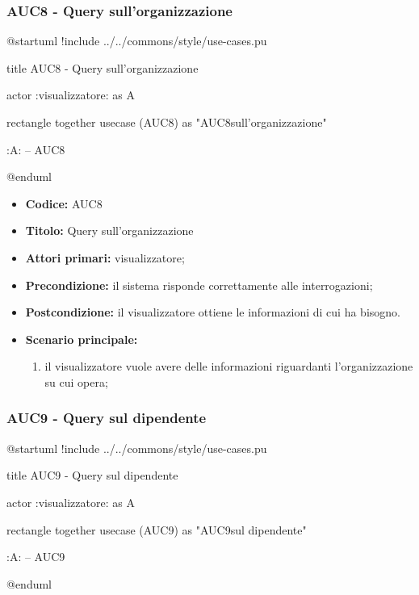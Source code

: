 \documentclass[casi-duso]{subfiles}
\begin{document}
\subsubsection{AUC8 - Query sull'organizzazione}%
\label{subsub:AUC8}

\begin{plantuml}
@startuml
!include ../../commons/style/use-cases.pu

title AUC8 - Query sull'organizzazione

actor :visualizzatore: as A

rectangle {
  together {
    usecase (AUC8) as "AUC8\nQuery sull'organizzazione"
  }
}

:A: -- AUC8

@enduml
\end{plantuml}

\begin{itemize}
  \item \textbf{Codice:} AUC8
  \item \textbf{Titolo:} Query sull'organizzazione
  \item \textbf{Attori primari:} visualizzatore;
  \item \textbf{Precondizione:} il sistema risponde correttamente alle interrogazioni;
  \item \textbf{Postcondizione:} il visualizzatore ottiene le informazioni di cui ha bisogno.
  \item \textbf{Scenario principale:}
  \begin{enumerate}
    \item il visualizzatore vuole avere delle informazioni riguardanti l'organizzazione su cui opera;
  \end{enumerate}
\end{itemize}

\subsubsection{AUC9 - Query sul dipendente}%
\label{subsub:AUC9}

\begin{plantuml}
@startuml
!include ../../commons/style/use-cases.pu

title AUC9 - Query sul dipendente

actor :visualizzatore: as A

rectangle {
  together {
    usecase (AUC9) as "AUC9\nQuery sul dipendente"
  }
}

:A: -- AUC9

@enduml
\end{plantuml}
\end{document}
